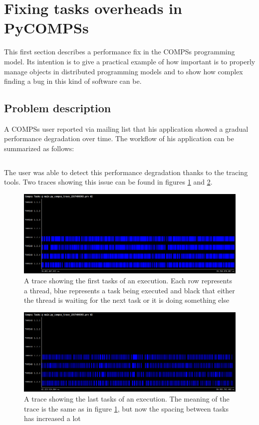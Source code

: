 \newpage
\section{Fixing tasks overheads in PyCOMPSs}
\label{sec:task_overhead}
This first section describes a performance fix in the COMPSs programming model. Its intention is to give a practical example of how important is to properly manage objects in distributed programming models and to show how complex finding a bug in this kind of software can be.

\subsection{Problem description}
A COMPSs user reported via mailing list that his application showed a gradual performance degradation over time. The workflow of his application can be summarized as follows:

\inputminted{python}{applications/TASK_OVERHEAD/main.py}

The user was able to detect this performance degradation thanks to the tracing tools. Two traces showing this issue can be found in figures \ref{fig:zoom_task_early} and \ref{fig:zoom_task_late}.

\begin{figure}
\centering
\includegraphics[scale = 0.3]{figures/zoom_task_early.png}
\caption{A trace showing the first tasks of an execution. Each row represents a thread, blue represents a task being executed and black that either the thread is waiting for the next task or it is doing something else}
\label{fig:zoom_task_early}
\end{figure}

\begin{figure}
\centering
\includegraphics[scale = 0.3]{figures/zoom_task_late.png}
\caption{A trace showing the last tasks of an execution. The meaning of the trace is the same as in figure \ref{fig:zoom_task_early}, but now the spacing between tasks has increased a lot}
\label{fig:zoom_task_late}
\end{figure}

